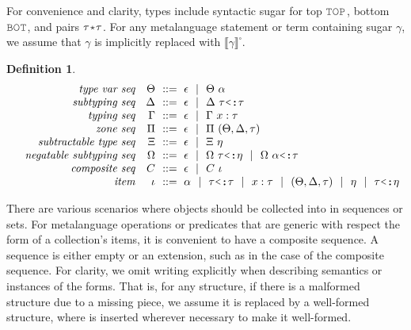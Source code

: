 \documentclass[table,dvipsnames,acmsmall]{acmart}
\theoremstyle{definition}
\newtheorem{definition}{Definition}[section]
\begin{document}
\noindent
For convenience and clarity, types include syntactic sugar for top $\J{TOP}$, 
bottom $\J{BOT}$, and pairs $\tau \J{*} \tau$.
For any metalanguage statement or term containing sugar $\gamma$, we assume that $\gamma$ is implicitly replaced with $\llbracket \gamma \rrbracket^\square$.

\begin{definition}
  \label{def:sequence}
  \small
  \nopad
  \[\begin{array}[t]{rr@{}l}
    \com{type var seq} &
    \nonterm{\Theta} & \is \epsilon \sep \Theta\ \alpha 
    \\
    \com{subtyping seq} &
    \nonterm{\Delta} & \is \epsilon \sep \Delta \  \tau \J{<:} \tau
    \\
    \com{typing seq} &
    \nonterm{\Gamma} & \is \epsilon \sep \Gamma\ x \hastype \tau
    \\
    \com{zone seq} &
    \nonterm{\Pi} & \is \epsilon \sep \Pi\ (\Theta, \Delta, \tau) 
    \\
    \com{subtractable type seq} &
    \nonterm{\Xi} & \is \epsilon \sep \Xi\ \eta 
    \\
    \com{negatable subtyping seq} &
    \nonterm{\Omega} & \is \epsilon \sep 
      \Omega\ \tau \J{<:} \eta \sep 
      \Omega\ \alpha \J{<:} \tau
    \\
    \com{composite seq} &
    \nonterm{C} & \is \epsilon \sep C\ \iota 
    \\
    \com{item} &
    \nonterm{\iota} & \is 
    \alpha
    \sep 
    \tau \J{<:} \tau
    \sep
    x \hastype \tau
    \sep
    (\Theta, \Delta, \tau)
    \sep
    \eta
    \sep
    \tau \J{<:} \eta

  \end{array}\]
\end{definition}


\noindent
There are various scenarios where objects should be collected into in sequences or sets.
For metalanguage operations or predicates that are generic with respect the form of a collection's items,
it is convenient to have a composite sequence.
A sequence is either empty \ms{\epsilon} or an extension,
such as  in the case of the composite sequence. 
For clarity, we omit writing \ms{\epsilon} explicitly when describing semantics or instances of the forms.
That is, for any structure, if there is a malformed structure due to a missing piece, 
we assume it is replaced by a well-formed structure, 
where \ms{\epsilon} is inserted wherever necessary to make it well-formed.
\end{document}

